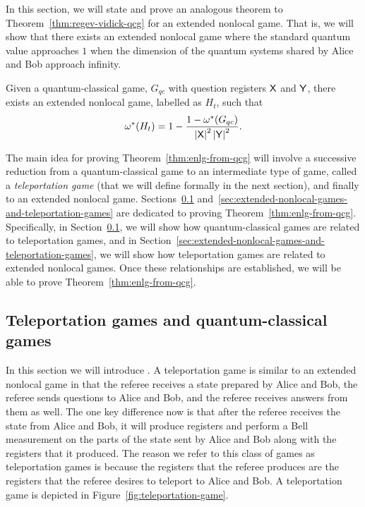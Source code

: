 In this section, we will state and prove an analogous theorem to Theorem~\ref{thm:regev-vidick-qcg} for an extended nonlocal game. That is, we will show that there exists an extended nonlocal game where the standard quantum value approaches $1$ when the dimension of the quantum systems shared by Alice and Bob approach infinity. 
\begin{theorem} \label{thm:enlg-from-qcg}
	Given a quantum-classical game, $G_{qc}$ with question registers $\mathsf{X}$ and $\mathsf{Y}$, there exists an extended nonlocal game, labelled as $H_t$, such that 
	\begin{align}
		\omega^*(H_t) = 1 - \frac{ 1 - \omega^*(G_{qc}) }{\left\lvert \mathsf{X} \right\rvert^2 \left\lvert \mathsf{Y} \right\rvert^2}.
	\end{align}
\end{theorem}
The main idea for proving Theorem~\ref{thm:enlg-from-qcg} will involve a successive reduction from a quantum-classical game to an intermediate type of game, called a \emph{teleportation game} (that we will define formally in the next section), and finally to an extended nonlocal game. Sections~\ref{sec:teleportation-games-and-quantum-classical-games} and~\ref{sec:extended-nonlocal-games-and-teleportation-games} are dedicated to proving Theorem~\ref{thm:enlg-from-qcg}. Specifically, in Section~\ref{sec:teleportation-games-and-quantum-classical-games}, we will show how quantum-classical games are related to teleportation games, and in Section~\ref{sec:extended-nonlocal-games-and-teleportation-games}, we will show how teleportation games are related to extended nonlocal games. Once these relationships are established, we will be able to prove Theorem~\ref{thm:enlg-from-qcg}.

\subsection{Teleportation games and quantum-classical games} \label{sec:teleportation-games-and-quantum-classical-games}

In this section we will introduce . A teleportation game is similar to an extended nonlocal game in that the referee receives a state prepared by Alice and Bob, the referee sends questions to Alice and Bob, and the referee receives answers from them as well. The one key difference now is that after the referee receives the state from Alice and Bob, it will produce registers and perform a Bell measurement on the parts of the state sent by Alice and Bob along with the registers that it produced. The reason we refer to this class of games as teleportation games is because the registers that the referee produces are the registers that the referee desires to teleport to Alice and Bob. A teleportation game is depicted in Figure~\ref{fig:teleportation-game}.

